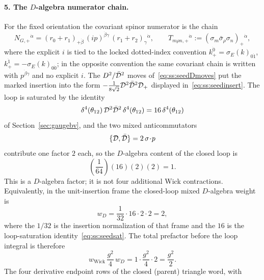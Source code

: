 \paragraph{5. The $D$-algebra numerator chain.}
For the fixed orientation the covariant spinor numerator is the chain
\begin{equation}\label{eq:ss:seedspinchain}
N_{G,+}{}^{\dot\alpha}
=(r_0+r_1)_{+\dot\beta}\,(ip)^{\dot\beta\gamma}\,
(r_1+r_2)_{\gamma}{}^{\dot\alpha},
\qquad
T_{m\rho n,+}{}^{\dot\alpha}
:=(\sigma_m\bar\sigma_\rho\sigma_n)_{+}{}^{\dot\alpha},
\end{equation}
where the explicit $i$ is tied to the locked dotted-index convention
$k_{+}^{\dot0}=\sigma_E(k)_{0\dot1}$,
$k_{+}^{\dot1}=-\sigma_E(k)_{0\dot0}$; in the opposite convention the same
covariant chain is written with $p^{\dot\beta\gamma}$ and no explicit $i$.
The $D^{2}/\bar{\mathcal{D}}^{2}$ moves of~\eqref{eq:ss:seedDmoves} put the marked
insertion into the form $-\frac{1}{8\sqrt2}\mathcal{D}^{2}\bar{\mathcal{D}}^{2}\mathcal{D}_{+}$ displayed
in~\eqref{eq:ss:seedinsert}. The loop is saturated by the identity
\begin{equation}\label{eq:ss:seedsat}
\delta^{4}(\theta_{12})\,\mathcal{D}^{2}\bar{\mathcal{D}}^{2}\,\delta^{4}(\theta_{12})
=16\,\delta^{4}(\theta_{12})
\end{equation}
of Section~\ref{sec:gaugebv}, and the two mixed anticommutators
\begin{equation}\label{eq:ss:seedmixed}
\{\mathcal{D},\bar{\mathcal{D}}\}=2\,\sigma\!\cdot\!p
\end{equation}
contribute one factor $2$ each, so the $D$-algebra content of the closed
loop is
\begin{equation}\label{eq:ss:seeddalg}
\left(\frac{1}{64}\right)(16)(2)(2)=1 .
\end{equation}
This is a $D$-algebra factor; it is not four additional Wick contractions.
Equivalently, in the unit-insertion frame the closed-loop mixed $D$-algebra
weight is
\begin{equation}\label{eq:ss:dweight}
w_D=\frac{1}{32}\cdot16\cdot2\cdot2=2 ,
\end{equation}
where the $1/32$ is the insertion normalization of that frame and the $16$
is the loop-saturation identity~\eqref{eq:ss:seedsat}. The total prefactor
before the loop integral is therefore
\begin{equation}\label{eq:ss:prefactor}
w_{\mathrm{Wick}}\,\frac{g^{2}}{4}\,w_D
=1\cdot\frac{g^{2}}{4}\cdot2=\frac{g^{2}}{2} .
\end{equation}
The four derivative endpoint rows of the closed (parent) triangle word, with
